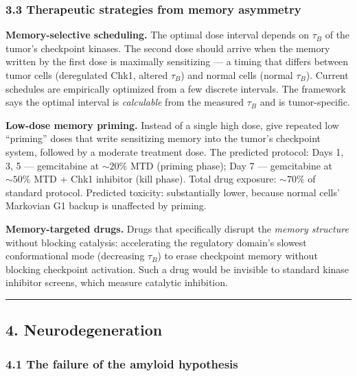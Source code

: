 \documentclass[
]{article}
\begin{document}
\hypertarget{therapeutic-strategies-from-memory-asymmetry}{%
\subsubsection{3.3 Therapeutic strategies from memory
asymmetry}\label{therapeutic-strategies-from-memory-asymmetry}}

\textbf{Memory-selective scheduling.} The optimal dose interval depends
on \(\tau_B\) of the tumor's checkpoint kinases. The second dose should
arrive when the memory written by the first dose is maximally
sensitizing --- a timing that differs between tumor cells (deregulated
Chk1, altered \(\tau_B\)) and normal cells (normal \(\tau_B\)). Current
schedules are empirically optimized from a few discrete intervals. The
framework says the optimal interval is \emph{calculable} from the
measured \(\tau_B\) and is tumor-specific.

\textbf{Low-dose memory priming.} Instead of a single high dose, give
repeated low ``priming'' doses that write sensitizing memory into the
tumor's checkpoint system, followed by a moderate treatment dose. The
predicted protocol: Days 1, 3, 5 --- gemcitabine at \(\sim 20\%\) MTD
(priming phase); Day 7 --- gemcitabine at \(\sim 50\%\) MTD + Chk1
inhibitor (kill phase). Total drug exposure: \(\sim 70\%\) of standard
protocol. Predicted toxicity: substantially lower, because normal cells'
Markovian G1 backup is unaffected by priming.

\textbf{Memory-targeted drugs.} Drugs that specifically disrupt the
\emph{memory structure} without blocking catalysis: accelerating the
regulatory domain's slowest conformational mode (decreasing \(\tau_B\))
to erase checkpoint memory without blocking checkpoint activation. Such
a drug would be invisible to standard kinase inhibitor screens, which
measure catalytic inhibition.

\begin{center}\rule{0.5\linewidth}{0.5pt}\end{center}

\hypertarget{neurodegeneration}{%
\subsection{4. Neurodegeneration}\label{neurodegeneration}}

\hypertarget{the-failure-of-the-amyloid-hypothesis}{%
\subsubsection{4.1 The failure of the amyloid
hypothesis}\label{the-failure-of-the-amyloid-hypothesis}}
\end{document}
